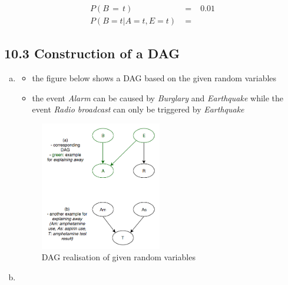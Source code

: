 \documentclass[10pt,a4paper]{article}
\begin{document}
\begin{eqnarray}
	P(B\,=\,t)\;&=&\;0.01			\\
	P(B=t|A=t,E=t)\;&=&\;
\end{eqnarray}


\subsection*{10.3 Construction of a DAG}
\begin{enumerate}[a)]
\item

\begin{itemize}
	\item the figure below shows a DAG based on the given random variables
	\item the event \textit{Alarm} can be caused by \textit{Burglary} and \textit{Earthquake} while the event \textit{Radio broadcast} can only be triggered by \textit{Earthquake}
\end{itemize}

	\begin{figure}[h]
  	\centering
    \includegraphics[width=0.5\textwidth]{103.png}
		\caption{DAG realisation of given random variables}
	\end{figure}

\item


\end{enumerate}
\end{document}
